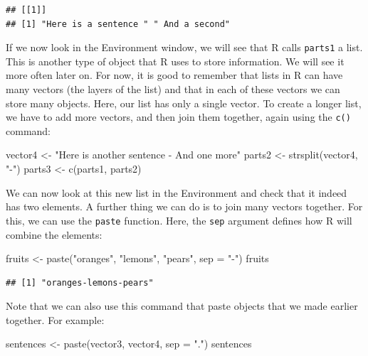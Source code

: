 \documentclass[
]{article}
\newenvironment{Shaded}{\begin{snugshade}}{\end{snugshade}}
\newcommand{\AttributeTok}[1]{\textcolor[rgb]{0.77,0.63,0.00}{#1}}
\newcommand{\FunctionTok}[1]{\textcolor[rgb]{0.00,0.00,0.00}{#1}}
\newcommand{\NormalTok}[1]{#1}
\newcommand{\OtherTok}[1]{\textcolor[rgb]{0.56,0.35,0.01}{#1}}
\newcommand{\StringTok}[1]{\textcolor[rgb]{0.31,0.60,0.02}{#1}}
\begin{document}
\begin{verbatim}
## [[1]]
## [1] "Here is a sentence " " And a second"
\end{verbatim}

If we now look in the Environment window, we will see that R calls \texttt{parts1} a list. This is another type of object that R uses to store information. We will see it more often later on. For now, it is good to remember that lists in R can have many vectors (the layers of the list) and that in each of these vectors we can store many objects. Here, our list has only a single vector. To create a longer list, we have to add more vectors, and then join them together, again using the \texttt{c()} command:

\begin{Shaded}
\begin{Highlighting}[]
\NormalTok{vector4 }\OtherTok{\textless{}{-}} \StringTok{"Here is another sentence {-} And one more"}
\NormalTok{parts2 }\OtherTok{\textless{}{-}} \FunctionTok{strsplit}\NormalTok{(vector4, }\StringTok{"{-}"}\NormalTok{)}
\NormalTok{parts3 }\OtherTok{\textless{}{-}} \FunctionTok{c}\NormalTok{(parts1, parts2)}
\end{Highlighting}
\end{Shaded}

We can now look at this new list in the Environment and check that it indeed has two elements. A further thing we can do is to join many vectors together. For this, we can use the \texttt{paste} function. Here, the \texttt{sep} argument defines how R will combine the elements:

\begin{Shaded}
\begin{Highlighting}[]
\NormalTok{fruits }\OtherTok{\textless{}{-}} \FunctionTok{paste}\NormalTok{(}\StringTok{"oranges"}\NormalTok{, }\StringTok{"lemons"}\NormalTok{, }\StringTok{"pears"}\NormalTok{, }\AttributeTok{sep =} \StringTok{"{-}"}\NormalTok{)}
\NormalTok{fruits}
\end{Highlighting}
\end{Shaded}

\begin{verbatim}
## [1] "oranges-lemons-pears"
\end{verbatim}

Note that we can also use this command that paste objects that we made earlier together. For example:

\begin{Shaded}
\begin{Highlighting}[]
\NormalTok{sentences }\OtherTok{\textless{}{-}} \FunctionTok{paste}\NormalTok{(vector3, vector4, }\AttributeTok{sep =} \StringTok{"."}\NormalTok{)}
\NormalTok{sentences}
\end{Highlighting}
\end{Shaded}
\end{document}
